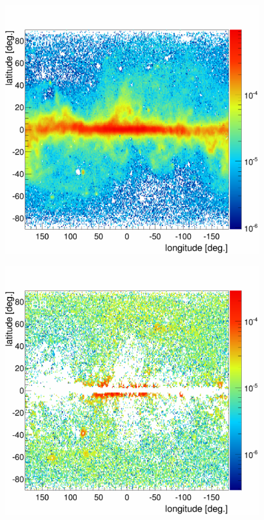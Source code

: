 \newpage
\begin{figure}[H]
  \centering
  \begin{minipage}[h]{0.45\textwidth}
  	\centering
	\includegraphics[width=1.\linewidth]{pic/results/SCR_PCR_Integral.png}
  	\subcaption{}
  	\label{app:BKGonly_PCR}
  \end{minipage}
  \hfill
  \begin{minipage}[h]{0.45\textwidth}
  	\centering
	\includegraphics[width=1.\linewidth]{pic/results/SCR_BR_Integral.png}

\end{minipage}
\end{figure}
